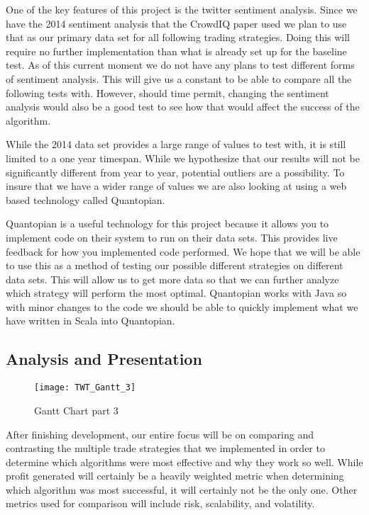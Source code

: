 One of the key features of this project is the twitter sentiment analysis. Since we have the 2014 sentiment analysis that the CrowdIQ paper used we plan to use that as our primary data set for all following trading strategies. Doing this will require no further implementation than what is already set up for the baseline test. As of this current moment we do not have any plans to test different forms of sentiment analysis. This will give us a constant to be able to compare all the following tests with. However, should time permit, changing the sentiment analysis would also be a good test to see how that would affect the success of the algorithm.

While the 2014 data set provides a large range of values to test with, it is still limited to a one year timespan. While we hypothesize that our results will not be significantly different from year to year, potential outliers are a possibility. To insure that we have a wider range of values we are also looking at using a web based technology called Quantopian.

Quantopian is a useful technology for this project because it allows you to implement code on their system to run on their data sets. This provides live feedback for how you implemented code performed. We hope that we will be able to use this as a method of testing our possible different strategies on different data sets. This will allow us to get more data so that we can further analyze which strategy will perform the most optimal. Quantopian works with Java so with minor changes to the code we should be able to quickly implement what we have written in Scala into Quantopian.


\subsection{Analysis and Presentation}
\begin{figure}[!ht]
	\centering
	\texttt{[image: TWT\_Gantt\_3]}
	\caption{Gantt Chart part 3}\label{fig:TWT_Gantt_3}
\end{figure}

After finishing development, our entire focus will be on comparing and contrasting the multiple trade strategies that we implemented in order to determine which algorithms were most effective and why they work so well.  While profit generated will certainly be a heavily weighted metric when determining which algorithm was most successful, it will certainly not be the only one.  Other metrics used for comparison will include risk, scalability, and volatility.

